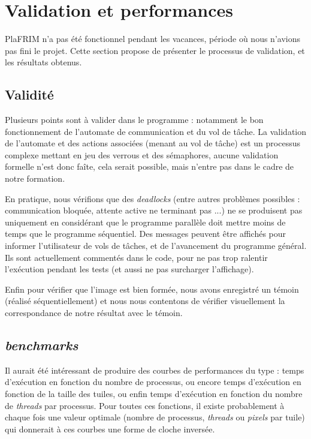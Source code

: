 \section{Validation et performances}

PlaFRIM n'a pas été fonctionnel pendant les vacances, période où nous n'avions pas fini le projet. Cette section propose de présenter le processus de validation, et les résultats obtenus.

\subsection{Validité}

Plusieurs points sont à valider dans le programme : notamment le bon fonctionnement de l'automate de communication et du vol de tâche. La validation de l'automate et des actions associées (menant au vol de tâche) est un processus complexe mettant en jeu des verrous et des sémaphores, aucune validation formelle n'est donc faîte, cela serait possible, mais n'entre pas dans le cadre de notre formation.

En pratique, nous vérifions que des \emph{deadlocks} (entre autres problèmes possibles : communication bloquée, attente active ne terminant pas ...) ne se produisent pas uniquement en considérant que le programme parallèle doit mettre moins de temps que le programme séquentiel. Des messages peuvent être affichés pour informer l'utilisateur de vols de tâches, et de l'avancement du programme général. Ils sont actuellement commentés dans le code, pour ne pas trop ralentir l'exécution pendant les tests (et aussi ne pas surcharger l'affichage).

Enfin pour vérifier que l'image est bien formée, nous avons enregistré un témoin (réalisé séquentiellement) et nous nous contentons de vérifier visuellement la correspondance de notre résultat avec le témoin.

\subsection{\emph{benchmarks}}

Il aurait été intéressant de produire des courbes de performances du type : temps d'exécution en fonction du nombre de processus, ou encore temps d'exécution en fonction de la taille des tuiles, ou enfin temps d'exécution en fonction du nombre de \emph{threads} par processus. Pour toutes ces fonctions, il existe probablement à chaque fois une valeur optimale (nombre de processus, \emph{threads} ou \emph{pixels} par tuile) qui donnerait à ces courbes une forme de cloche inversée.

